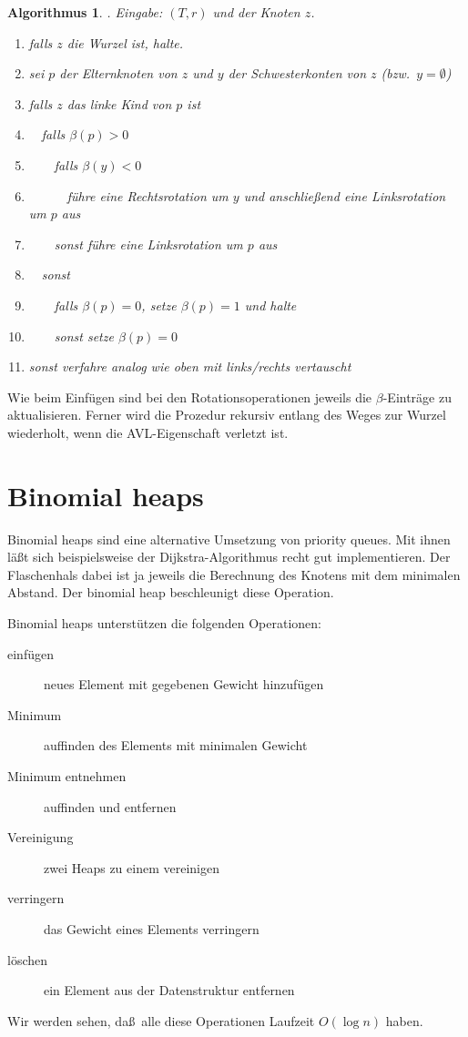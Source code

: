 \documentclass[10pt,reqno]{amsart}
\numberwithin{equation}{section}
\newtheorem{algorithm}[definition]{Algorithmus}
\begin{document}
\begin{algorithm}. {\em Eingabe:} $(T,r)$ und der Knoten $z$.
	\begin{enumerate}
		\item falls $z$ die Wurzel ist, halte.
		\item sei $p$ der Elternknoten von $z$ und $y$ der Schwesterkonten von $z$ (bzw.\ $y=\emptyset$)
		\item falls $z$ das linke Kind von $p$ ist
		\item $\quad$falls $\beta(p)>0$
		\item $\qquad$falls $\beta(y)<0$
		\item $\quad\qquad$f\"uhre eine Rechtsrotation um $y$ und anschlie\ss end eine Linksrotation um $p$ aus
		\item $\qquad$sonst f\"uhre eine Linksrotation um $p$ aus
		\item $\quad$sonst
		\item $\qquad$falls $\beta(p)=0$, setze $\beta(p)=1$ und halte
		\item $\qquad$sonst setze $\beta(p)=0$ %
		\item sonst verfahre analog wie oben mit links/rechts vertauscht
	\end{enumerate}
\end{algorithm}

Wie beim Einf\"ugen sind bei den Rotationsoperationen jeweils die $\beta$-Eintr\"age zu aktualisieren.
Ferner wird die Prozedur rekursiv entlang des Weges zur Wurzel wiederholt, wenn die AVL-Eigenschaft verletzt ist.


\section{Binomial heaps}\label{sec_binomial}

\noindent
Binomial heaps sind eine alternative Umsetzung von priority queues.
Mit ihnen l\"a\ss t sich beispielsweise der Dijkstra-Algorithmus recht gut implementieren.
Der Flaschenhals dabei ist ja jeweils die Berechnung des Knotens mit dem minimalen Abstand.
Der binomial heap beschleunigt diese Operation.

Binomial heaps unterst\"utzen die folgenden Operationen:
\begin{description}
	\item[einf\"ugen] neues Element mit gegebenen Gewicht hinzuf\"ugen
	\item[Minimum] auffinden des Elements mit minimalen Gewicht
	\item[Minimum entnehmen] auffinden und entfernen
	\item[Vereinigung] zwei Heaps zu einem vereinigen
	\item[verringern] das Gewicht eines Elements verringern
	\item[l\"oschen] ein Element aus der Datenstruktur entfernen
\end{description}
Wir werden sehen, da\ss\ alle diese Operationen Laufzeit $O(\log n)$ haben.
\end{document}
